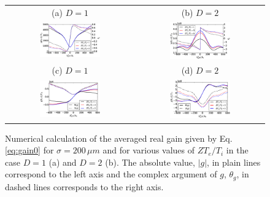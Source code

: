 \documentclass[
 reprint,
 amsmath,amssymb,
 aps,
]{revtex4-1}
\begin{document}
\begin{widetext}
 \begin{figure}[!]
\begin{tabular}{cc}
(a) $D=1$ &(b) $D=2$ \\
\includegraphics[width=0.49\textwidth]{int_akin_sin.eps}
 &
\includegraphics[width=0.49\textwidth]{int_akin_sin_D2.eps}\\
(c) $D=1$ &(d) $D=2$ \\
\includegraphics[width=0.49\textwidth]{int_akin_sin_gr.eps}
 &
\includegraphics[width=0.49\textwidth]{int_akin_sin_D2_gr.eps}
\end{tabular}
\caption{ \label{fig:intakinsin}
Numerical calculation of the averaged real gain given by Eq. \eqref{eq:gain0} for $\sigma = 200 \,\mu m$ and  for various values of $ZT_e/T_i$ in the case $D=1$ (a) and $D=2$ (b). The absolute value, $\vert g \vert $,  in plain lines correspond to the left axis and the complex argument of $g$, $\theta_g$, in dashed lines  corresponds to the right axis.
}
\end{figure}
\end{widetext}
\end{document}
